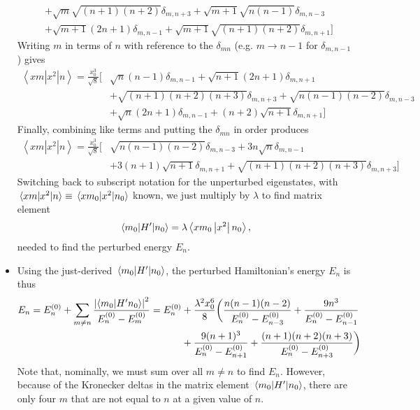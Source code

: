\documentclass[11pt, a4paper]{article}
\newcommand{\Ham}{Hamiltonian\xspace}
\newcommand{\threebraket}[3]{\left \langle {#1} \left | {#2} \right | {#3} \right \rangle}  %
\begin{document}
\begin{itemize}
\begin{align*}
		& + \sqrt{m}\sqrt{(n+1)(n+2)}\delta_{m,n+3} + \sqrt{m+1}\sqrt{n(n-1)}\delta_{m,n-3}\\
		& + \sqrt{m+1}(2n+1)\delta_{m,n-1} + \sqrt{m+1}\sqrt{(n+1)(n+2)}\delta_{m,n+1} \Big]
	\end{align*}	
	Writing $ m $ in terms of $ n $ with reference to the $ \delta_{mn} $ (e.g. $ m \to n -1 $ for $ \delta_{m, n-1} $) gives
	\begin{align*}
			\threebraket{xm}{x^{2}}{n} = \frac{x_{0}^{3}}{\sqrt{8}} \Big[& \sqrt{n}(n-1) \delta_{m, n-1} + \sqrt{n+1}(2n+1)\delta_{m, n+1} \\
			& + \sqrt{(n+1)(n+2)(n+3)}\delta_{m, n+3}  + \sqrt{n(n-1)(n-2)}\delta_{m, n-3} \\
			& + \sqrt{n}(2n+1)\delta_{m, n-1} + (n+2)\sqrt{n+1}\delta_{m, n+1}\Big]
	\end{align*}
	Finally, combining like terms and putting the $ \delta_{mn} $ in order produces
	\begin{align*}
		\threebraket{xm}{x^{2}}{n} = \frac{x_{0}^{3}}{\sqrt{8}} \Big[&\sqrt{n(n-1)(n-2)}\delta_{m, n-3} + 3n\sqrt{n}\delta_{m, n-1}\\
		& + 3(n+1)\sqrt{n+1}\delta_{m, n+1} + \sqrt{(n+1)(n+2)(n+3)}\delta_{m, n+3}\Big]
	\end{align*}
	Switching back to subscript notation for the unperturbed eigenstates, with $ \mel{xm}{x^{2}}{n} \equiv \mel{xm_{0}}{x^{2}}{n_{0}} $ known, we just multiply by $ \lambda $ to find matrix element
	\begin{equation*}
		\mel{m_{0}}{H'}{n_{0}} = \lambda \threebraket{xm_{0}}{x^{2}}{n_{0}},
	\end{equation*}
 	needed to find the perturbed energy $ E_{n} $.
	
	\item Using the just-derived $ \mel{m_{0}}{H'}{n_{0}}  $, the perturbed \Ham's energy $ E_{n} $ is thus
	\begin{align*}
		E_{n} = E^{(0)}_{n} + \sum_{m \neq n} \frac{\abs{\braket{m_{0}}{H'n_{0}}}^{2}}{E^{(0)}_{n} - E^{(0)}_{m}} = E^{(0)}_{n} &+ \frac{\lambda^{2} x_{0}^{6}}{8}\bigg(\frac{n(n-1)(n-2)}{E^{(0)}_{n}-E^{(0)}_{n-3}} + \frac{9n^{3}}{E^{(0)}_{n}-E^{(0)}_{n-1}} \\
		&+ \frac{9(n+1)^{3}}{E^{(0)}_{n} - E^{(0)}_{n+1}} + \frac{(n+1)(n+2)(n+3)}{E^{(0)}_{n} - E^{(0)}_{n+3}} \bigg)
	\end{align*}
	Note that, nominally, we must sum over all $ m \neq n $ to find $ E_{n} $. However, because of the Kronecker deltas in the matrix element $ \mel{m_{0}}{H'}{n_{0}} $, there are only four $ m $ that are not equal to $ n $ at a given value of $ n $. 
	

\end{itemize}
\end{document}
